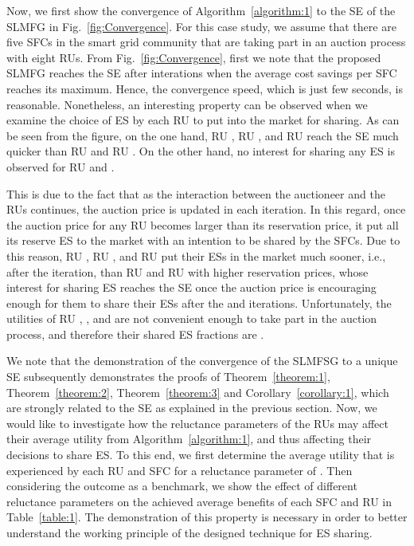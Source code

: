 \documentclass[journal,10pt]{IEEEtran}
\begin{document}
Now, we first show the convergence of Algorithm~\ref{algorithm:1} to the SE of the SLMFG in Fig.~\ref{fig:Convergence}. For this case study, we assume that there are five SFCs in the smart grid community that are taking part in an auction process with eight RUs. From Fig.~\ref{fig:Convergence}, first we note that the proposed SLMFG reaches the SE after  interations when the average cost savings per SFC reaches its maximum. Hence, the convergence speed, which is just few seconds, is reasonable. Nonetheless, an interesting property can be observed when we examine the choice of ES by each RU to put into the market for sharing. As can be seen from the figure, on the one hand, RU , RU , and RU  reach the SE much quicker than RU  and RU . On the other hand, no interest for sharing any ES is observed for RU  and . 

This is due to the fact that as the interaction between the auctioneer and the RUs continues, the auction price  is updated in each iteration. In this regard, once the auction price for any RU becomes larger than its reservation price, it put all its reserve ES to the market with an intention to be shared by the SFCs. Due to this reason, RU , RU , and RU  put their ESs in the market much sooner, i.e., after the  iteration, than RU  and RU  with higher reservation prices, whose interest for sharing ES reaches the SE once the auction price is encouraging enough for them to share their ESs after the  and  iterations. Unfortunately, the utilities of RU , , and  are not convenient enough to take part in the auction process, and therefore their shared ES fractions are . 

We note that the demonstration of the convergence of the SLMFSG to a unique SE subsequently demonstrates the proofs of Theorem~\ref{theorem:1}, Theorem~\ref{theorem:2}, Theorem~\ref{theorem:3} and Corollary~\ref{corollary:1}, which are strongly related to the SE as explained in the previous section. Now, we would like to investigate how the reluctance parameters of the RUs may affect their average utility from Algorithm~\ref{algorithm:1}, and thus affecting their decisions to share ES. To this end, we first determine the average utility that is experienced by each RU and SFC for a reluctance parameter of . Then considering the outcome as a benchmark, we show the effect of different reluctance parameters on the achieved average benefits of each SFC and RU in Table~\ref{table:1}. The demonstration of this property is necessary in order to better understand the working principle of the designed technique for ES sharing.
\end{document}
